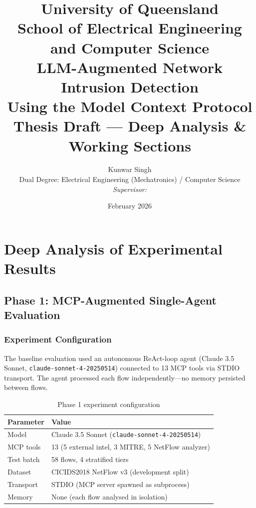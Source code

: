 \documentclass[12pt, a4paper, oneside]{report}
\title{%
  \vspace{-2cm}
  {\Large University of Queensland}\\[0.5em]
  {\large School of Electrical Engineering and Computer Science}\\[2em]
  {\LARGE\bfseries LLM-Augmented Network Intrusion Detection\\
  Using the Model Context Protocol}\\[1.5em]
  {\large Thesis Draft --- Deep Analysis \& Working Sections}\\[1em]
}
\author{%
  Kunwar Singh\\
  Dual Degree: Electrical Engineering (Mechatronics) / Computer Science\\[0.5em]
  \textit{Supervisor:} \todo{TBD}
}
\date{February 2026}
\begin{document}
\maketitle
\tableofcontents
\newpage


\part{Deep Analysis of Experimental Results}
\label{part:analysis}


\chapter{Phase 1: MCP-Augmented Single-Agent Evaluation}
\label{ch:phase1-analysis}

\section{Experiment Configuration}

The baseline evaluation used an autonomous ReAct-loop agent (Claude 3.5 Sonnet,
\texttt{claude-sonnet-4-20250514}) connected to 13 MCP tools via STDIO transport.
The agent processed each flow independently---no memory persisted between flows.

\begin{table}[H]
\centering
\caption{Phase 1 experiment configuration}
\label{tab:phase1-config}
\begin{tabular}{@{}ll@{}}
\toprule
\textbf{Parameter} & \textbf{Value} \\
\midrule
Model             & Claude 3.5 Sonnet (\texttt{claude-sonnet-4-20250514}) \\
MCP tools         & 13 (5 external intel, 3 MITRE, 5 NetFlow analyzer) \\
Test batch        & 58 flows, 4 stratified tiers \\
Dataset           & CICIDS2018 NetFlow v3 (development split) \\
Transport         & STDIO (MCP server spawned as subprocess) \\
Memory            & None (each flow analysed in isolation) \\
\bottomrule
\end{tabular}
\end{table}
\end{document}
